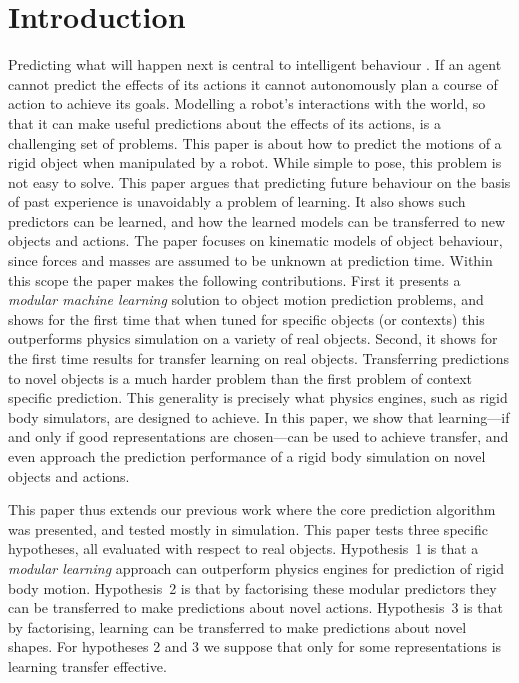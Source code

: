 \section{Introduction}\label{sec:Introduction}

Predicting what will happen next is central to intelligent behaviour \citep{craik1967nature}. If an agent cannot predict the effects of its actions it cannot autonomously plan a course of action to achieve its goals. Modelling a robot's interactions with the world, so that it can make useful predictions about the effects of its actions, is a challenging set of problems. This paper is about how to predict the motions of a rigid object when manipulated by a robot. While simple to pose, this problem is not easy to solve. This paper argues that predicting future behaviour on the basis of past experience is unavoidably a problem of learning. It also shows such predictors can be learned, and how the learned models can be transferred to new objects and actions. The paper focuses on kinematic models of object behaviour, since forces and masses are assumed to be unknown at prediction time. Within this scope the paper makes the following contributions. First it presents a {\em modular machine learning} solution to object motion prediction problems, and shows for the first time that when tuned for specific objects (or contexts) this outperforms physics simulation on a variety of real objects.  Second, it shows for the first time results for transfer learning on real objects. Transferring predictions to novel objects is a much harder problem than the first problem of context specific prediction. This generality is precisely what physics engines, such as rigid body simulators, are designed to achieve. In this paper, we show that learning---if and only if good representations are chosen---can be used to achieve transfer, and even approach the prediction performance of a rigid body simulation on novel objects and actions.

This paper thus extends our previous work \citep{kopicki_prediction_2010,kopicki-etal-icra11}  where the core prediction algorithm was presented, and tested mostly in simulation.  This paper tests three specific hypotheses, all evaluated with respect to real objects. Hypothesis~1 is that a {\em modular learning} approach can outperform physics engines for prediction of rigid body motion.  Hypothesis~2 is that by factorising these modular predictors they can be transferred to make predictions about novel actions. Hypothesis~3 is that by factorising, learning can be transferred  to make predictions about novel shapes. For hypotheses 2 and 3 we suppose that only for some representations is learning transfer effective.

